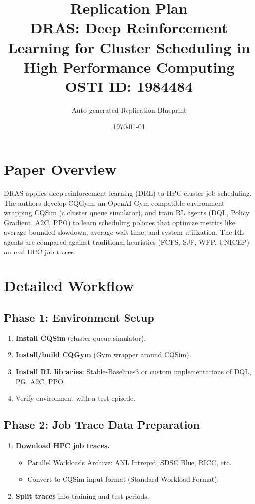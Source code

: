 \documentclass[11pt,a4paper]{article}
\title{\textbf{Replication Plan}\\[0.5em]
\large DRAS: Deep Reinforcement Learning for Cluster Scheduling in High Performance Computing\\[0.3em]
\normalsize OSTI ID: 1984484}
\author{Auto-generated Replication Blueprint}
\date{\today}
\begin{document}
\maketitle
\tableofcontents
\newpage

\section{Paper Overview}
DRAS applies deep reinforcement learning (DRL) to HPC cluster job scheduling. The authors develop CQGym, an OpenAI Gym-compatible environment wrapping CQSim (a cluster queue simulator), and train RL agents (DQL, Policy Gradient, A2C, PPO) to learn scheduling policies that optimize metrics like average bounded slowdown, average wait time, and system utilization. The RL agents are compared against traditional heuristics (FCFS, SJF, WFP, UNICEP) on real HPC job traces.

\section{Detailed Workflow}

\subsection{Phase 1: Environment Setup}
\begin{enumerate}[label=\textbf{1.\arabic*}]
  \item \textbf{Install CQSim} (cluster queue simulator).
  \item \textbf{Install/build CQGym} (Gym wrapper around CQSim).
  \item \textbf{Install RL libraries}: Stable-Baselines3 or custom implementations of DQL, PG, A2C, PPO.
  \item Verify environment with a test episode.
\end{enumerate}

\subsection{Phase 2: Job Trace Data Preparation}
\begin{enumerate}[label=\textbf{2.\arabic*}]
  \item \textbf{Download HPC job traces.}
    \begin{itemize}
      \item Parallel Workloads Archive: ANL Intrepid, SDSC Blue, RICC, etc.
      \item Convert to CQSim input format (Standard Workload Format).
    \end{itemize}
  \item \textbf{Split traces} into training and test periods.
\end{enumerate}
\end{document}
